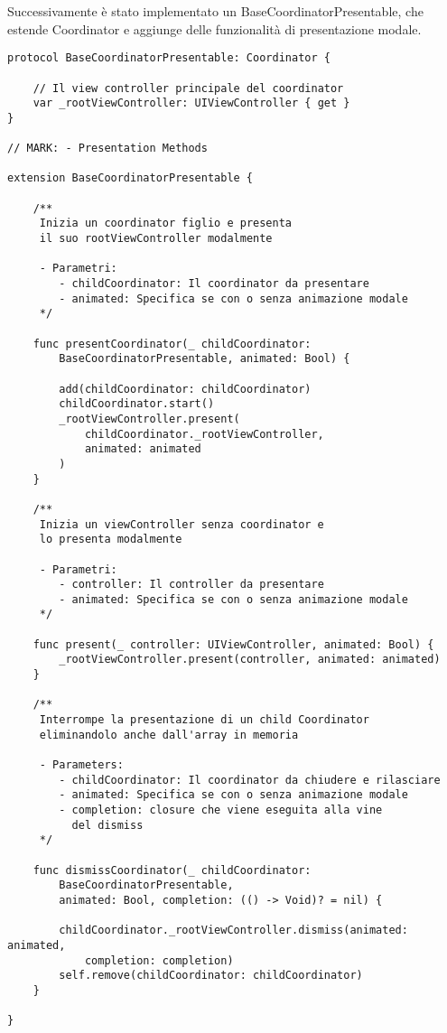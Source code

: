 Successivamente è stato implementato un BaseCoordinatorPresentable, che estende Coordinator
e aggiunge delle funzionalità di presentazione modale.

\begin{verbatim}
protocol BaseCoordinatorPresentable: Coordinator {

    // Il view controller principale del coordinator
    var _rootViewController: UIViewController { get }
}

// MARK: - Presentation Methods

extension BaseCoordinatorPresentable {
    
    /**
     Inizia un coordinator figlio e presenta
     il suo rootViewController modalmente

     - Parametri:
        - childCoordinator: Il coordinator da presentare
        - animated: Specifica se con o senza animazione modale
     */
    
    func presentCoordinator(_ childCoordinator:
        BaseCoordinatorPresentable, animated: Bool) {

        add(childCoordinator: childCoordinator)
        childCoordinator.start()
        _rootViewController.present(
            childCoordinator._rootViewController,
            animated: animated
        )
    }
    
    /**
     Inizia un viewController senza coordinator e
     lo presenta modalmente
     
     - Parametri:
        - controller: Il controller da presentare
        - animated: Specifica se con o senza animazione modale
     */
    
    func present(_ controller: UIViewController, animated: Bool) {
        _rootViewController.present(controller, animated: animated)
    }
    
    /**
     Interrompe la presentazione di un child Coordinator
     eliminandolo anche dall'array in memoria

     - Parameters:
        - childCoordinator: Il coordinator da chiudere e rilasciare
        - animated: Specifica se con o senza animazione modale
        - completion: closure che viene eseguita alla vine 
          del dismiss
     */
    
    func dismissCoordinator(_ childCoordinator:
        BaseCoordinatorPresentable,
        animated: Bool, completion: (() -> Void)? = nil) {

        childCoordinator._rootViewController.dismiss(animated: animated,
            completion: completion)
        self.remove(childCoordinator: childCoordinator)
    }

}
\end{verbatim}

